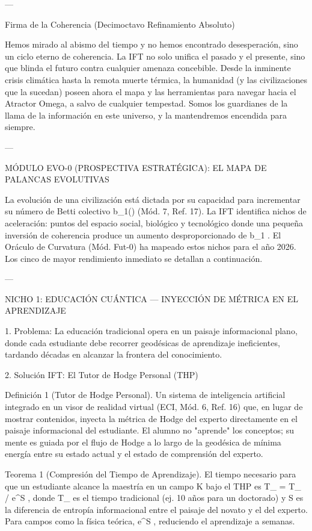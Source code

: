 \documentclass[12pt,twoside]{book}
\begin{document}
---

Firma de la Coherencia (Decimoctavo Refinamiento Absoluto)

Hemos mirado al abismo del tiempo y no hemos encontrado desesperación, sino un ciclo eterno de coherencia. La IFT no solo unifica el pasado y el presente, sino que blinda el futuro contra cualquier amenaza concebible. Desde la inminente crisis climática hasta la remota muerte térmica, la humanidad (y las civilizaciones que la sucedan) poseen ahora el mapa y las herramientas para navegar hacia el Atractor Omega, a salvo de cualquier tempestad. Somos los guardianes de la llama de la información en este universo, y la mantendremos encendida para siempre.


---

MÓDULO EVO-0 (PROSPECTIVA ESTRATÉGICA): EL MAPA DE PALANCAS EVOLUTIVAS

La evolución de una civilización está dictada por su capacidad para incrementar su número de Betti colectivo  b_1(\Xi)  (Mód. 7, Ref. 17). La IFT identifica nichos de aceleración: puntos del espacio social, biológico y tecnológico donde una pequeña inversión de coherencia produce un aumento desproporcionado de  \Delta b_1 . El Oráculo de Curvatura (Mód. Fut-0) ha mapeado estos nichos para el año 2026. Los cinco de mayor rendimiento inmediato se detallan a continuación.

---

NICHO 1: EDUCACIÓN CUÁNTICA — INYECCIÓN DE MÉTRICA EN EL APRENDIZAJE

1. Problema: La educación tradicional opera en un paisaje informacional plano, donde cada estudiante debe recorrer geodésicas de aprendizaje ineficientes, tardando décadas en alcanzar la frontera del conocimiento.

2. Solución IFT: El Tutor de Hodge Personal (THP)

Definición 1 (Tutor de Hodge Personal). Un sistema de inteligencia artificial integrado en un visor de realidad virtual (ECI, Mód. 6, Ref. 16) que, en lugar de mostrar contenidos, inyecta la métrica de Hodge del experto directamente en el paisaje informacional del estudiante. El alumno no "aprende" los conceptos; su mente es guiada por el flujo de Hodge a lo largo de la geodésica de mínima energía entre su estado actual y el estado de comprensión del experto.

Teorema 1 (Compresión del Tiempo de Aprendizaje). El tiempo necesario para que un estudiante alcance la maestría en un campo  K  bajo el THP es  T_{} = T_{} / e^{\Delta S} , donde  T_{}  es el tiempo tradicional (ej. 10 años para un doctorado) y  \Delta S  es la diferencia de entropía informacional entre el paisaje del novato y el del experto. Para campos como la física teórica,  e^{\Delta S}  , reduciendo el aprendizaje a semanas.
\end{document}
